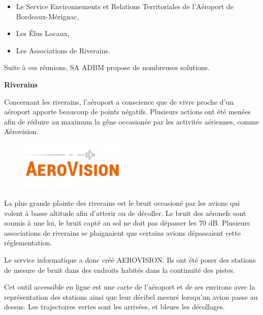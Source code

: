 \begin{itemize}
  \item Le Service Environnements et Relations Territoriales de l'Aéroport de Bordeaux-Mérignac,
  \item Les Élus Locaux,
  \item Les Associations de Riverains.
\end{itemize}

Suite à ces réunions, SA ADBM propose de nombreuses solutions.\newline

\textbf{Riverains}\newline

Concernant les riverains, l'aéroport a conscience que de vivre proche d'un aéroport apporte beaucoup de points négatifs.
Plusieurs actions ont été menées afin de réduire au maximum la gêne occasionée par les activités aériennes, comme Aérovision.

\begin{figure}[hbt!]
  \centering
  \includegraphics[width=5cm]{Images/logo_aerovision.jpg}
  \label{fig:logoaerovision}
\end{figure}

La plus grande plainte des riverains est le bruit occasioné par les avions qui volent à basse altitude afin d'atterir ou de décoller.
Le bruit des aéronefs sont soumis à une loi, le bruit capté au sol ne doit pas dépasser les 70 dB. Plusieurs associations de riverains se plaignaient que certains avions dépassaient cette réglementation.\newline

Le service informatique a donc créé AEROVISION. Ils ont été poser des stations de mesure de bruit dans des endroits habités dans la continuité des pistes.

Cet outil accessible en ligne est une carte de l'aéroport et de ses environs avec la représentation des stations ainsi que leur décibel mesuré lorsqu'un avion passe au dessus. Les trajectoires vertes sont les arrivées, et bleues les décollages.

